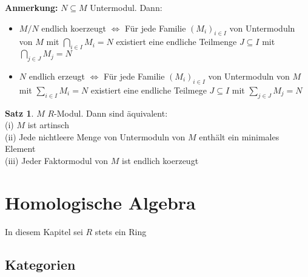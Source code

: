 \documentclass[10pt,a4paper,numbers=endperiod]{scrreprt}
\theoremstyle{definition}
\newtheorem{satz}{Satz}[section]
\begin{document}
\textbf{Anmerkung:} $N \subseteq M$ Untermodul. Dann:
\begin{itemize}
	\item $M/N$ endlich koerzeugt $\Leftrightarrow$ Für jede Familie $(M_i)_{i \in I}$ von Untermoduln von $M$ mit $\bigcap\limits_{i \in I} M_i = N$ existiert eine endliche Teilmenge $J \subseteq I$ mit $\bigcap\limits_{j \in J} M_j = N$
	\item $N$ endlich erzeugt $\Leftrightarrow$ Für jede Familie $(M_i)_{i \in I}$ von Untermoduln von $M$ mit $\sum\limits_{i \in I} M_i = N$ existiert eine endliche Teilmege $J \subseteq I$ mit $\sum\limits_{j \in J} M_j = N$
\end{itemize}

\begin{satz}
	$M$ $R$-Modul. Dann sind äquivalent:\\
	(i) $M$ ist artinsch\\
	(ii) Jede nichtleere Menge von Untermoduln von $M$ enthält ein minimales Element\\
	(iii) Jeder Faktormodul von $M$ ist endlich koerzeugt
\end{satz}

\part{Homologische Algebra} 

In diesem Kapitel sei $R$ stets ein Ring\\

\chapter{Kategorien} 
\end{document}
